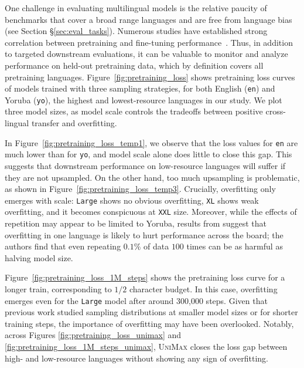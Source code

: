 \documentclass{article} %
\newcommand{\unimax}{\textsc{UniMax}}
\begin{document}
One challenge in evaluating multilingual models is the relative paucity of benchmarks that cover a broad range languages and are free from language bias (see Section \S\ref{sec:eval_tasks}). Numerous studies have established strong correlation between pretraining and fine-tuning performance~\citep[][\textit{inter alia}]{devlin-etal-2019-bert,narang-etal-2021-transformer,tay2022scale}. Thus, in addition to targeted downstream evaluations, it can be valuable to monitor and analyze performance on held-out pretraining data, which by definition covers all pretraining languages. Figure~\ref{fig:pretraining_loss} shows pretraining loss curves of models trained with three sampling strategies, for both English (\texttt{en}) and Yoruba (\texttt{yo}), the highest and lowest-resource languages in our study. We plot three model sizes, as model scale controls the tradeoffs between positive cross-lingual transfer and overfitting.

In Figure~\ref{fig:pretraining_loss_temp1}, we observe that the loss values for \texttt{en} are much lower than for \texttt{yo}, and model scale alone does little to close this gap. This suggests that downstream performance on low-resource languages will suffer if they are not upsampled. On the other hand, too much upsampling is problematic, as shown in Figure~\ref{fig:pretraining_loss_temp3}. Crucially, overfitting only emerges with scale: \texttt{Large} shows no obvious overfitting, \texttt{XL} shows weak overfitting, and it becomes conspicuous at \texttt{XXL} size.  Moreover, while the effects of repetition may appear to be limited to Yoruba, results from \citet{hernandez2022scaling} suggest that overfitting in one language is likely to hurt performance across the board; the authors find that even repeating $0.1\%$ of data $100$ times can be as harmful as halving model size.

Figure~\ref{fig:pretraining_loss_1M_steps} shows the pretraining loss curve for a longer train, corresponding to $1/2$ character budget. In this case, overfitting emerges even for the \texttt{Large} model after around 300,000 steps. Given that previous work \citep{conneau-etal-2020-unsupervised, xue-etal-2021-mt5} studied sampling distributions at smaller model sizes or for shorter training steps, the importance of overfitting may have been overlooked. Notably, across Figures \ref{fig:pretraining_loss_unimax} and \ref{fig:pretraining_loss_1M_steps_unimax}, \unimax{} closes the loss gap between high- and low-resource languages without showing any sign of overfitting.
\end{document}
